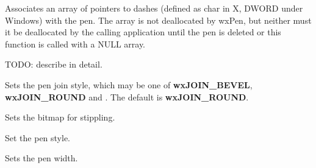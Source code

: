 
\label{wxpensetdashes}


Associates an array of pointers to dashes (defined as char in X, DWORD under Windows)
with the pen. The array is not deallocated by wxPen, but neither must it be
deallocated by the calling application until the pen is deleted or this
function is called with a NULL array.

TODO: describe in detail.



\label{wxpensetjoin}


Sets the pen join style, which may be one of {\bf wxJOIN\_BEVEL}, {\bf wxJOIN\_ROUND} and
. The default is {\bf wxJOIN\_ROUND}.



\label{wxpensetstipple}


Sets the bitmap for stippling.



\label{wxpensetstyle}


Set the pen style.



\label{wxpensetwidth}


Sets the pen width.



\label{wxpenassignment}

